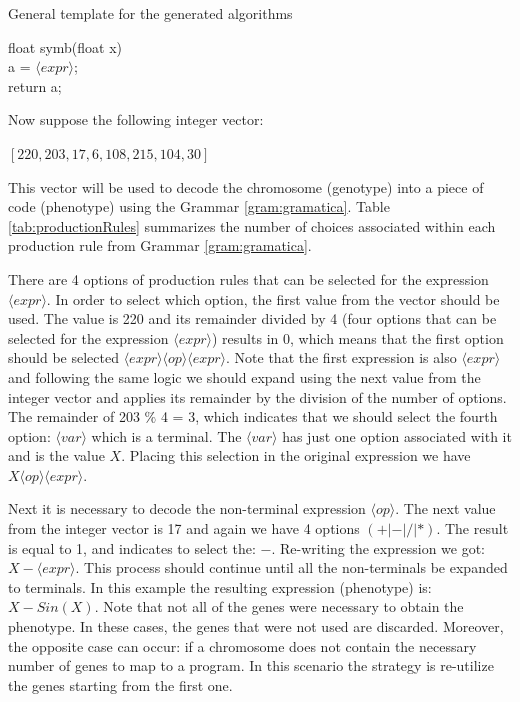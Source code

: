 \documentclass[conference]{IEEEtran}
\begin{document}
\begin{algorithm}
	\caption{General template for the generated algorithms}
	\label{alg:pseudocodigogrammar}
	float symb(float x) { \\
		a = $\langle expr \rangle$;   \\
		return a;  \\
	}	
\end{algorithm}


\noindent
Now suppose the following integer vector:

\begin{center}
	$ [220, 203, 17, 6, 108, 215, 104, 30] $
\end{center}

This vector will be used to decode the chromosome (genotype) into a piece of code (phenotype)  using the Grammar \ref{gram:gramatica}.
Table \ref{tab:productionRules} summarizes the number of choices associated within each production rule from Grammar \ref{gram:gramatica}. 

There are 4 options of production rules that can be selected for the expression $ \langle expr \rangle$. In order to select which option, the first value from the vector should be used. The value is 220 and its remainder divided by 4 (four options that can be selected for the expression $ \langle expr \rangle$) results in 0, which means that the first option should be selected $\langle expr \rangle \langle op \rangle \langle expr \rangle$. Note that the first expression is also $ \langle expr \rangle$ and following the same logic we should expand using the next value from the integer vector and applies its remainder by the division of the number of options. The remainder of 203 $\%$ 4 = 3, which indicates that we should select the fourth option: $ \langle var \rangle$ which is a terminal. The $ \langle var \rangle$ has just one option associated with it and is the value $X$. Placing this selection in the original expression we have $X \langle op \rangle \langle expr \rangle$. 

Next it is necessary to decode the non-terminal expression $\langle op \rangle$. The next value from the integer vector is 17 and again we have 4 options $(+ | - | / | *)$. The result is equal to 1, and indicates to select the: $-$. Re-writing the expression we got:  $X  -  \langle expr \rangle$. This process should continue until all the non-terminals be expanded to terminals. In this example the resulting expression (phenotype) is: $X - Sin (X)$. Note that not all of the genes were necessary to obtain the phenotype. In these cases, the genes that were not used are discarded. Moreover, the opposite case can occur: if a chromosome does not contain the necessary number of genes to map to a program. In this scenario the strategy is re-utilize the genes starting from the first one.
\end{document}
